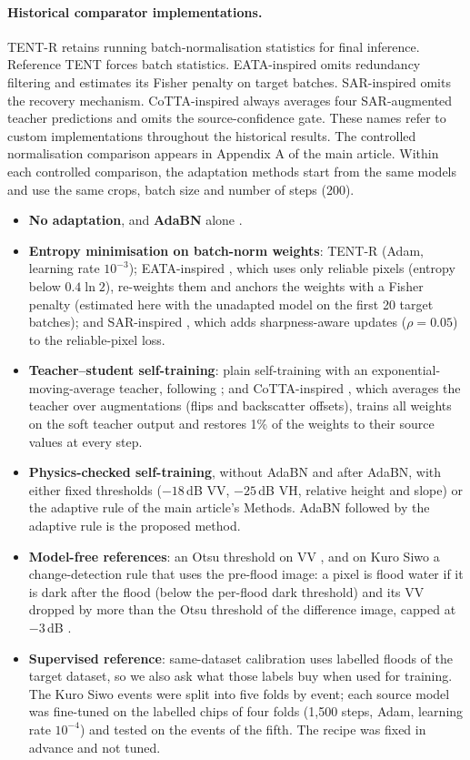 \paragraph{Historical comparator implementations.} TENT-R retains running batch-normalisation statistics for final inference. Reference TENT forces batch statistics. EATA-inspired omits redundancy filtering and estimates its Fisher penalty on target batches. SAR-inspired omits the recovery mechanism. CoTTA-inspired always averages four SAR-augmented teacher predictions and omits the source-confidence gate. These names refer to custom implementations throughout the historical results. The controlled normalisation comparison appears in Appendix A of the main article.
Within each controlled comparison, the adaptation methods start from the same models and use the same crops, batch size and number of steps (200).
\begin{itemize}
\item \textbf{No adaptation}, and \textbf{AdaBN} alone \citep{li2018adabn}.
\item \textbf{Entropy minimisation on batch-norm weights}: TENT-R \citep{wang2021tent} (Adam, learning rate $10^{-3}$); EATA-inspired \citep{niu2022eata}, which uses only reliable pixels (entropy below $0.4\ln 2$), re-weights them and anchors the weights with a Fisher penalty (estimated here with the unadapted model on the first 20 target batches); and SAR-inspired \citep{niu2023sar}, which adds sharpness-aware updates ($\rho=0.05$) to the reliable-pixel loss.
\item \textbf{Teacher--student self-training}: plain self-training with an exponential-moving-average teacher, following \citet{chen2026cimttda}; and CoTTA-inspired \citep{wang2022cotta}, which averages the teacher over augmentations (flips and backscatter offsets), trains all weights on the soft teacher output and restores 1\% of the weights to their source values at every step.
\item \textbf{Physics-checked self-training}, without AdaBN and after AdaBN, with either fixed thresholds ($-18$\,dB VV, $-25$\,dB VH, relative height and slope) or the adaptive rule of the main article's Methods. AdaBN followed by the adaptive rule is the proposed method.
\item \textbf{Model-free references}: an Otsu threshold on VV \citep{otsu1979threshold}, and on Kuro Siwo a change-detection rule that uses the pre-flood image: a pixel is flood water if it is dark after the flood (below the per-flood dark threshold) and its VV dropped by more than the Otsu threshold of the difference image, capped at $-3$\,dB \citep{giustarini2013change,clement2018multitemporal}.
\item \textbf{Supervised reference}: same-dataset calibration uses labelled floods of the target dataset, so we also ask what those labels buy when used for training. The Kuro Siwo events were split into five folds by event; each source model was fine-tuned on the labelled chips of four folds (1,500 steps, Adam, learning rate $10^{-4}$) and tested on the events of the fifth. The recipe was fixed in advance and not tuned.
\end{itemize}
